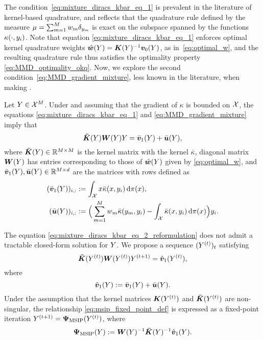 The condition~\eqref{eq:mixture_diracs_kbar_eq_1} is prevalent in the literature of kernel-based quadrature, and reflects that the quadrature rule defined by the measure $\mu = \sum_{m = 1 }^{M} w_{m} \delta_{y_{m}}$ is exact on the subspace spanned by the functions $\kappa(\cdot,y_{i})$. Note that equation 
\eqref{eq:mixture_diracs_kbar_eq_1} enforces optimal kernel quadrature weights $    \hat{\bm{w}}(Y) = \bm{K}(Y)^{-1} \bm{v}_{0}(Y)$, as in~\eqref{eq:optimal_w}, and the resulting quadrature rule thus satisfies the optimality property \eqref{eq:MMD_optimality_okq}. 
Now, we explore the second condition~\eqref{eq:MMD_gradient_mixture}, less known in the literature, when making .
\begin{proposition}\label{prop:steady_state_equation_on_y}
Let $Y \in \mathcal{X}^{M}$. Under  and assuming that the gradient of $\kappa$ is bounded on $\mathcal{X}$, the equations \eqref{eq:mixture_diracs_kbar_eq_1} and \eqref{eq:MMD_gradient_mixture} imply that 
\begin{equation}\label{eq:mixture_diracs_kbar_eq_2_reformulation}
     \bm{\bar{K}}(Y)\bm{W}(Y)Y  = \bar{\bm{v}}_{1}(Y) +  \bar{\bm{u}}(Y),
\end{equation}
where $\bm{\bar{K}}(Y) \in \mathbb{R}^{M \times M}$ is the kernel matrix with the kernel $\bar{\kappa}$, diagonal matrix $\bm{W}(Y)$ has entries corresponding to those of $\hat{\bm{w}}(Y)$ given by \eqref{eq:optimal_w}, and
$\bar{\bm{v}}_{1}(Y), \bar{\bm{u}}(Y) \in \mathbb{R}^{M \times d }$ are the matrices with rows defined as
\begin{align}\label{eq:u_vonebar_def}
(\bar{\bm{v}}_{1}(Y))_{i,:} &:=  \int_{\mathcal{X}} x \bar{\kappa}(x,y_{i})\,\mathrm{d}\pi(x),\\
(\bar{\bm{u}}(Y))_{i,:} &:= \Big(\sum\limits_{m=1}^M w_{m}\bar{\kappa}(y_{m},y_{i}) - \int_{\mathcal{X}} \bar{\kappa}(x,y_{i})\,\mathrm{d}\pi(x)\Big)y_{i}.\nonumber
\end{align}
\end{proposition}



The equation \eqref{eq:mixture_diracs_kbar_eq_2_reformulation} does not admit a tractable closed-form solution for $Y$. We propose a sequence $(Y^{(t)})_{t}$ satisfying
\begin{equation}\label{eq:msip_fixed_point_def}
     \bm{\bar{K}}(Y^{(t)}) \bm{W}(Y^{(t)}) Y^{(t+1)} = \hat{\bm{v}}_{1}(Y^{(t)}),
\end{equation}
where 
\begin{equation}\label{eq:v_hat_def}
    \hat{\bm{v}}_{1}(Y):=  \bar{\bm{v}}_{1}(Y) +  \bar{\bm{u}}(Y).
\end{equation}
Under the assumption that the kernel matrices $\bm{K}(Y^{(t)})$ and $\bm{\bar{K}}(Y^{(t)})$ are non-singular, the relationship \eqref{eq:msip_fixed_point_def} is expressed as a fixed-point iteration $Y^{(t+1)} =  \bm{\Psi}_{\mathrm{MSIP}}(Y^{(t)})$, where
\begin{equation}\label{eq:fixed_point_general_case}
    \bm{\Psi}_{\mathrm{MSIP}}(Y): = \bm{W}(Y)^{-1} \bm{\bar{K}}(Y)^{-1} \hat{\bm{v}}_{1}(Y).
\end{equation}


